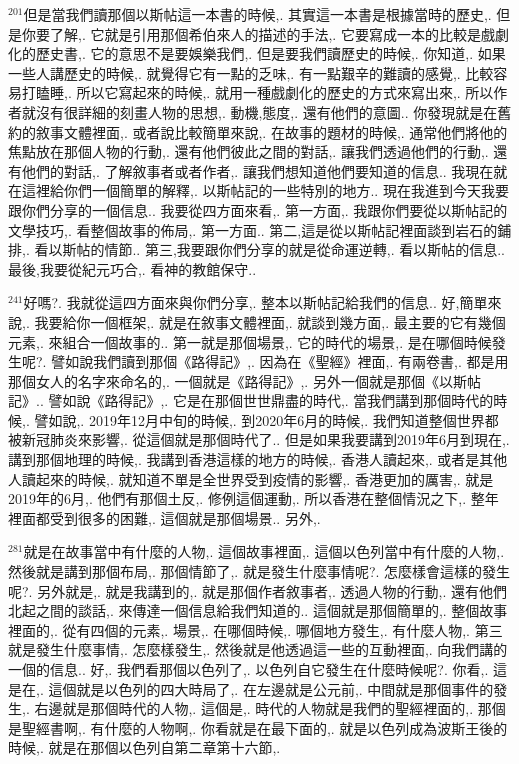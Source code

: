 \documentclass{book}
\begin{document}
$^{201}$但是當我們讀那個以斯帖這一本書的時候,.
其實這一本書是根據當時的歷史,.
但是你要了解,.
它就是引用那個希伯來人的描述的手法,.
它要寫成一本的比較是戲劇化的歷史書,.
它的意思不是要娛樂我們,.
但是要我們讀歷史的時候,.
你知道,.
如果一些人講歷史的時候,.
就覺得它有一點的乏味,.
有一點艱辛的難讀的感覺,.
比較容易打瞌睡,.
所以它寫起來的時候,.
就用一種戲劇化的歷史的方式來寫出來,.
所以作者就沒有很詳細的刻畫人物的思想,.
動機,態度,.
還有他們的意圖..
你發現就是在舊約的敘事文體裡面,.
或者說比較簡單來說,.
在故事的題材的時候,.
通常他們將他的焦點放在那個人物的行動,.
還有他們彼此之間的對話,.
讓我們透過他們的行動,.
還有他們的對話,.
了解敘事者或者作者,.
讓我們想知道他們要知道的信息..
我現在就在這裡給你們一個簡單的解釋,.
以斯帖記的一些特別的地方..
現在我進到今天我要跟你們分享的一個信息..
我要從四方面來看,.
第一方面,.
我跟你們要從以斯帖記的文學技巧,.
看整個故事的佈局,.
第一方面..
第二,這是從以斯帖記裡面談到岩石的鋪排,.
看以斯帖的情節..
第三,我要跟你們分享的就是從命運逆轉,.
看以斯帖的信息..
最後,我要從紀元巧合,.
看神的教館保守..

$^{241}$好嗎?.
我就從這四方面來與你們分享,.
整本以斯帖記給我們的信息..
好,簡單來說,.
我要給你一個框架,.
就是在敘事文體裡面,.
就談到幾方面,.
最主要的它有幾個元素,.
來組合一個故事的..
第一就是那個場景,.
它的時代的場景,.
是在哪個時候發生呢?.
譬如說我們讀到那個《路得記》,.
因為在《聖經》裡面,.
有兩卷書,.
都是用那個女人的名字來命名的,.
一個就是《路得記》,.
另外一個就是那個《以斯帖記》..
譬如說《路得記》,.
它是在那個世世鼎盡的時代,.
當我們講到那個時代的時候,.
譬如說,.
2019年12月中旬的時候,.
到2020年6月的時候,.
我們知道整個世界都被新冠肺炎來影響,.
從這個就是那個時代了..
但是如果我要講到2019年6月到現在,.
講到那個地理的時候,.
我講到香港這樣的地方的時候,.
香港人讀起來,.
或者是其他人讀起來的時候,.
就知道不單是全世界受到疫情的影響,.
香港更加的厲害,.
就是2019年的6月,.
他們有那個土反,.
修例這個運動,.
所以香港在整個情況之下,.
整年裡面都受到很多的困難,.
這個就是那個場景..
另外,.

$^{281}$就是在故事當中有什麼的人物,.
這個故事裡面,.
這個以色列當中有什麼的人物,.
然後就是講到那個布局,.
那個情節了,.
就是發生什麼事情呢?.
怎麼樣會這樣的發生呢?.
另外就是,.
就是我講到的,.
就是那個作者敘事者,.
透過人物的行動,.
還有他們北起之間的談話,.
來傳達一個信息給我們知道的..
這個就是那個簡單的,.
整個故事裡面的,.
從有四個的元素,.
場景,.
在哪個時候,.
哪個地方發生,.
有什麼人物,.
第三就是發生什麼事情,.
怎麼樣發生,.
然後就是他透過這一些的互動裡面,.
向我們講的一個的信息..
好,.
我們看那個以色列了,.
以色列自它發生在什麼時候呢?.
你看,.
這是在,.
這個就是以色列的四大時局了,.
在左邊就是公元前,.
中間就是那個事件的發生,.
右邊就是那個時代的人物,.
這個是,.
時代的人物就是我們的聖經裡面的,.
那個是聖經書啊,.
有什麼的人物啊,.
你看就是在最下面的,.
就是以色列成為波斯王後的時候,.
就是在那個以色列自第二章第十六節,.
\end{document}

